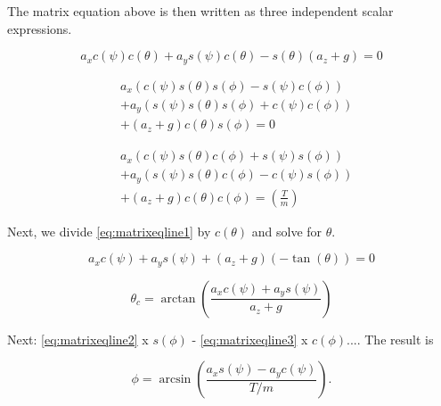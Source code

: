 The matrix equation above is then written as three independent scalar expressions.




\begin{equation}
    \label{eq:matrixeqline1}
    a_x c(\psi) c(\theta) + a_y s(\psi) c(\theta) - s(\theta)( a_z + g ) = 0
\end{equation}

\begin{equation}
    \label{eq:matrixeqline2}
    \begin{split}
    & a_x (c(\psi) s(\theta) s(\phi) - s(\psi) c(\phi))\\ 
    &+ a_y (s(\psi) s(\theta) s(\phi) + c(\psi) c(\phi))\\ 
    &+ ( a_z + g )c(\theta) s(\phi) = 0
\end{split}    
\end{equation}

\begin{equation}
    \label{eq:matrixeqline3}
    \begin{split}    
    & a_x (c(\psi) s(\theta) c(\phi) + s(\psi) s(\phi))\\ 
    &+ a_y (s(\psi) s(\theta) c(\phi) - c(\psi) s(\phi))\\ 
    &+ ( a_z + g )c(\theta) c(\phi) = (\frac{T}{m})
\end{split}
\end{equation}


Next, we divide \eqref{eq:matrixeqline1} by $c(\theta)$ and solve for $\theta$.

\begin{equation}
a_x c(\psi) + a_y s(\psi) + (a_z+g)(-\tan(\theta)) = 0
\end{equation}


\begin{equation}
    \label{eq:thetac}
    \theta_c = \arctan( \frac{a_x c(\psi) + a_y s(\psi)}{a_z+g} )
\end{equation}


Next: \eqref{eq:matrixeqline2} x $ s(\phi) $ - \eqref{eq:matrixeqline3} x $ c(\phi) ...$. The result is

\begin{equation}
    \label{eq:phiIntermediate}
    \phi = \arcsin( \frac{a_x s(\psi) - a_y c(\psi)}{T/m} ).
\end{equation}

